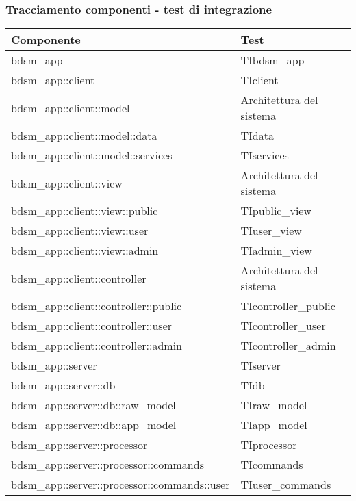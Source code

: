 		\subsubsection{Tracciamento componenti - test di integrazione}
			\begin{center}
			\def\arraystretch{1.5}
			\bgroup
			\begin{longtable}{| p{6cm} | p{4cm} |}
					\hline
					\textbf{Componente} & \textbf{Test}\\
					\hline
					bdsm\_app & TIbdsm\_app\\
					\hline
					bdsm\_app::\-client & TIclient\\
					\hline
					bdsm\_app::\-client::\-model & Architettura del sistema\\
					\hline
					bdsm\_app::\-client::\-model::\-data & TIdata\\
					\hline
					bdsm\_app::\-client::\-model::\-services & TIservices\\
					\hline
					bdsm\_app::\-client::\-view & Architettura del sistema\\
					\hline
					bdsm\_app::\-client::\-view::\-public & TIpublic\_view\\
					\hline
					bdsm\_app::\-client::\-view::\-user & TIuser\_view\\
					\hline
					bdsm\_app::\-client::\-view::\-admin & TIadmin\_view\\
					\hline
					bdsm\_app::\-client::\-controller & Architettura del sistema\\
					\hline
					bdsm\_app::\-client::\-controller::\-public & TIcontroller\_public\\
					\hline
					bdsm\_app::\-client::\-controller::\-user & TIcontroller\_user\\
					\hline
					bdsm\_app::\-client::\-controller::\-admin & TIcontroller\_admin\\
					\hline
					bdsm\_app::\-server & TIserver\\
					\hline
					bdsm\_app::\-server::\-db & TIdb\\
					\hline
					bdsm\_app::\-server::\-db::\-raw\_model & TIraw\_model\\
					\hline
					bdsm\_app::\-server::\-db::\-app\_model & TIapp\_model\\
					\hline
					bdsm\_app::\-server::\-processor & TIprocessor\\
					\hline
					bdsm\_app::\-server::\-processor::\-commands & TIcommands\\
					\hline
					bdsm\_app::\-server::\-processor::\-commands::\-user & TIuser\_commands\\

\end{longtable}
\end{center}
